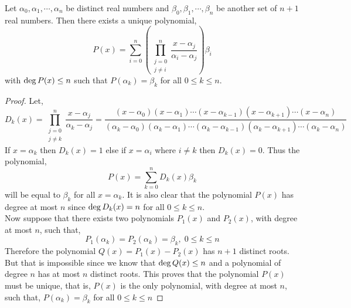 \begin{theorem}\label{thm:lagrange-interpol}
    Let $\alpha_{0}, \alpha_{1},\cdots , \alpha_{n}$ be distinct real numbers and 
    $\beta_{0}, \beta_{1}, \cdots, \beta_{n}$ be another set of $n+1$ real numbers. 
    Then there exists a unique polynomial,
    \[
    P(x) = \sum_{i=0}^{n} \left( \prod_{\substack{j=0\\ j\neq i}}^{n} \frac{x - \alpha_{j}}{\alpha_{i} - \alpha_{j}} \right) \beta_{i}
    \]
    with $\operatorname{deg} P(x) \leq n$ such that $P(\alpha_{k}) = \beta_{k}$ for all $0\leq k \leq n$.
\end{theorem}
\begin{proof}
    Let,
    \[
    D_{k}(x) = \prod_{\substack{j=0 \\ j\neq k}}^{n} \frac{x - \alpha_{j}}{\alpha_{k} - \alpha_{j}} = 
    \frac{(x-\alpha_{0})(x-\alpha_{1})\cdots (x - \alpha_{k-1})(x - \alpha_{k+1}) \cdots (x - \alpha_{n})}
         {(\alpha_{k}-\alpha_{0})(\alpha_{k}-\alpha_{1})\cdots (\alpha_{k} - \alpha_{k-1})(\alpha_{k} - \alpha_{k+1}) \cdots (\alpha_{k} - \alpha_{n})}
    \]
    If $x=\alpha_k$ then $D_k(x) = 1$ else if $x=\alpha_i$ where 
    $i \neq k$ then $D_k(x)=0$. Thus the polynomial,
    \[ P(x) = \sum_{k=0}^n D_k(x) \beta_k \]
    will be equal to $\beta_k$ for all $x=\alpha_k$. It is also clear that the 
    polynomial $P(x)$ has degree at most $n$ since $\operatorname{deg} D_k(x)=n$ for all 
    $0 \leq k \leq n$. \\
    Now suppose that there exists two polynomials $P_1(x)$ and $P_2(x)$, with degree at 
    most $n$, such that,
    \[ P_1(\alpha_k) = P_2(\alpha_k) = \beta_k, \; 0\leq k \leq n\]
    Therefore the polynomial $Q(x) = P_1(x) - P_2(x)$ has $n+1$ distinct roots. 
    But that is impossible since we know that $\operatorname{deg} Q(x) \leq n$ and 
    a polynomial of degree $n$ has at most $n$ distinct roots. This proves that 
    the polynomial $P(x)$ must be unique, that is, $P(x)$ is the only polynomial, with 
    degree at most $n$, such that, 
    $P(\alpha_k) = \beta_k$ for all $0 \leq k \leq n$
\end{proof}

